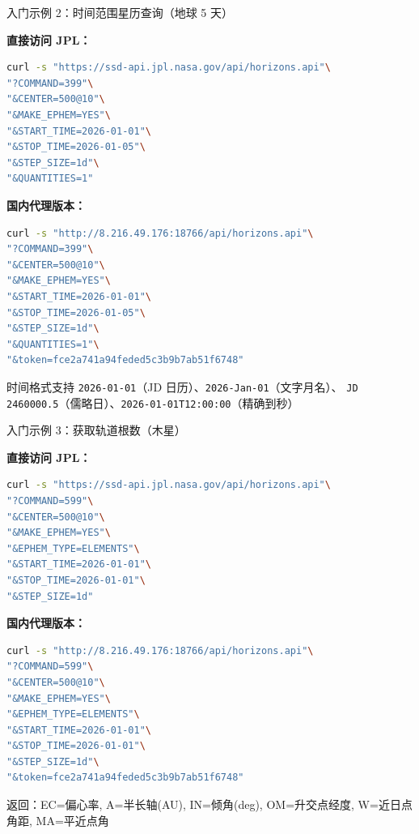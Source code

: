 \documentclass[aspectratio=169]{ctexbeamer}
\begin{document}
\begin{frame}{入门示例 2：时间范围星历查询（地球 5 天）}
\small

\textbf{直接访问 JPL：}

\begin{lstlisting}[language=bash]
curl -s "https://ssd-api.jpl.nasa.gov/api/horizons.api"\
"?COMMAND=399"\
"&CENTER=500@10"\
"&MAKE_EPHEM=YES"\
"&START_TIME=2026-01-01"\
"&STOP_TIME=2026-01-05"\
"&STEP_SIZE=1d"\
"&QUANTITIES=1"
\end{lstlisting}

\vspace{0.15cm}

\textbf{国内代理版本：}

\begin{lstlisting}[language=bash]
curl -s "http://8.216.49.176:18766/api/horizons.api"\
"?COMMAND=399"\
"&CENTER=500@10"\
"&MAKE_EPHEM=YES"\
"&START_TIME=2026-01-01"\
"&STOP_TIME=2026-01-05"\
"&STEP_SIZE=1d"\
"&QUANTITIES=1"\
"&token=fce2a741a94feded5c3b9b7ab51f6748"
\end{lstlisting}

\vspace{0.15cm}

\begin{block}{时间格式支持}
  \texttt{2026-01-01}（JD 日历）、\texttt{2026-Jan-01}（文字月名）、
  \texttt{JD 2460000.5}（儒略日）、\texttt{2026-01-01T12:00:00}（精确到秒）
\end{block}
\end{frame}

\begin{frame}[fragile,shrink]{入门示例 3：获取轨道根数（木星）}
\small

\textbf{直接访问 JPL：}

\begin{lstlisting}[language=bash]
curl -s "https://ssd-api.jpl.nasa.gov/api/horizons.api"\
"?COMMAND=599"\
"&CENTER=500@10"\
"&MAKE_EPHEM=YES"\
"&EPHEM_TYPE=ELEMENTS"\
"&START_TIME=2026-01-01"\
"&STOP_TIME=2026-01-01"\
"&STEP_SIZE=1d"
\end{lstlisting}

\vspace{0.15cm}

\textbf{国内代理版本：}

\begin{lstlisting}[language=bash]
curl -s "http://8.216.49.176:18766/api/horizons.api"\
"?COMMAND=599"\
"&CENTER=500@10"\
"&MAKE_EPHEM=YES"\
"&EPHEM_TYPE=ELEMENTS"\
"&START_TIME=2026-01-01"\
"&STOP_TIME=2026-01-01"\
"&STEP_SIZE=1d"\
"&token=fce2a741a94feded5c3b9b7ab51f6748"
\end{lstlisting}

\vspace{0.15cm}

\footnotesize
返回：EC=偏心率, A=半长轴(AU), IN=倾角(deg), OM=升交点经度, W=近日点角距, MA=平近点角
\end{frame}
\end{document}
